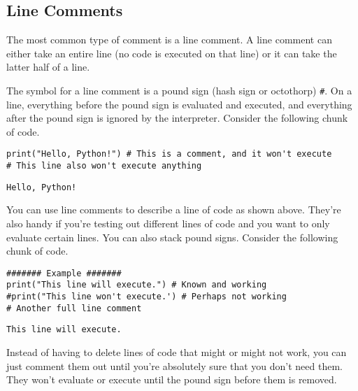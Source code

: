 \subsection{Line Comments}
The most common type of comment is a line comment. A line comment can either take an entire line (no code is executed on that line) or it can take the latter half of a line.\par
The symbol for a line comment is a pound sign (hash sign or octothorp) \verb|#|. On a line, everything before the pound sign is evaluated and executed, and everything after the pound sign is ignored by the interpreter. Consider the following chunk of code.\par
\begin{lstlisting}[style=pippython]
print("Hello, Python!") # This is a comment, and it won't execute
# This line also won't execute anything
\end{lstlisting}
\begin{lstlisting}
Hello, Python!
\end{lstlisting}
You can use line comments to describe a line of code as shown above. They're also handy if you're testing out different lines of code and you want to only evaluate certain lines. You can also stack pound signs. Consider the following chunk of code.\par
\begin{lstlisting}[style=pippython]
####### Example #######
print("This line will execute.") # Known and working
#print("This line won't execute.') # Perhaps not working
# Another full line comment
\end{lstlisting}
\begin{lstlisting}
This line will execute.
\end{lstlisting}
Instead of having to delete lines of code that might or might not work, you can just comment them out until you're absolutely sure that you don't need them. They won't evaluate or execute until the pound sign before them is removed.\par
